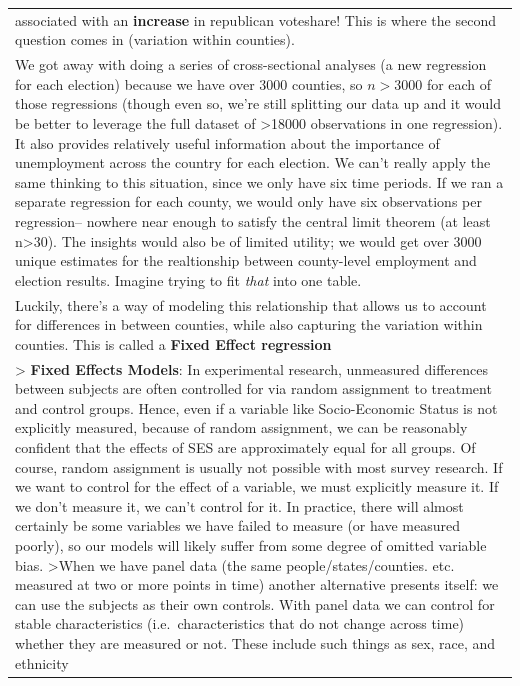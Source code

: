 \documentclass[
  letterpaper,
  DIV=11,
  numbers=noendperiod]{scrreprt}
\begin{document}
\begin{longtable}[]{@{}
  >{\raggedright\arraybackslash}p{}@{}}
associated with an \textbf{increase} in republican voteshare! This is
where the second question comes in (variation within counties). \\
We got away with doing a series of cross-sectional analyses (a new
regression for each election) because we have over 3000 counties, so
\(n>3000\) for each of those regressions (though even so, we're still
splitting our data up and it would be better to leverage the full
dataset of \textgreater18000 observations in one regression). It also
provides relatively useful information about the importance of
unemployment across the country for each election. We can't really apply
the same thinking to this situation, since we only have six time
periods. If we ran a separate regression for each county, we would only
have six observations per regression-- nowhere near enough to satisfy
the central limit theorem (at least n\textgreater30). The insights would
also be of limited utility; we would get over 3000 unique estimates for
the realtionship between county-level employment and election results.
Imagine trying to fit \emph{that} into one table. \\
Luckily, there's a way of modeling this relationship that allows us to
account for differences in between counties, while also capturing the
variation within counties. This is called a \textbf{Fixed Effect
regression} \\
\textgreater{} \textbf{Fixed Effects Models}: In experimental research,
unmeasured differences between subjects are often controlled for via
random assignment to treatment and control groups. Hence, even if a
variable like Socio-Economic Status is not explicitly measured, because
of random assignment, we can be reasonably confident that the effects of
SES are approximately equal for all groups. Of course, random assignment
is usually not possible with most survey research. If we want to control
for the effect of a variable, we must explicitly measure it. If we don't
measure it, we can't control for it. In practice, there will almost
certainly be some variables we have failed to measure (or have measured
poorly), so our models will likely suffer from some degree of omitted
variable bias. \textgreater When we have panel data (the same
people/states/counties. etc. measured at two or more points in time)
another alternative presents itself: we can use the subjects as their
own controls. With panel data we can control for stable characteristics
(i.e.~characteristics that do not change across time) whether they are
measured or not. These include such things as sex, race, and ethnicity

\end{longtable}
\end{document}
